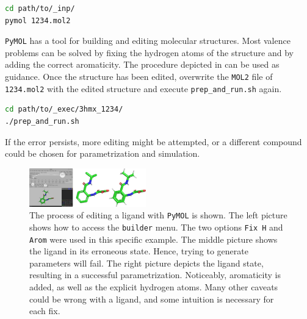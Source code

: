 \documentclass[9pt,tutorial]{livecoms}
\newcommand{\code}[1]{\colorbox{light-gray}{\texttt{#1}}}
\begin{document}
\begin{lstlisting}[language=bash]
cd path/to/_inp/
pymol 1234.mol2
\end{lstlisting}
\texttt{PyMOL} has a tool for building and editing molecular structures. Most valence problems can be solved by fixing the hydrogen atoms of the structure and by adding the correct aromaticity. The procedure depicted in  can be used as guidance. Once the structure has been edited, overwrite the \texttt{MOL2} file of \code{1234.mol2} with the edited structure and execute \code{prep\_and\_run.sh} again.
\begin{lstlisting}[language=bash]
cd path/to/_exec/3hmx_1234/
./prep_and_run.sh
\end{lstlisting}
If the error persists, more editing might be attempted, or a different compound could be chosen for parametrization and simulation.

\begin{figure}[H]
\centering
\includegraphics[width=0.45\textwidth]{figures/ligandfix_manual_guide.png}
\caption{The process of editing a ligand with \texttt{PyMOL} is shown. The left picture shows how to access the \texttt{builder} menu. The two options \texttt{Fix H} and \texttt{Arom} were used in this specific example. The middle picture shows the ligand in its erroneous state. Hence, trying to generate parameters will fail. The right picture depicts the ligand state, resulting in a successful parametrization. Noticeably, aromaticity is added, as well as the explicit hydrogen atoms. Many other caveats could be wrong with a ligand, and some intuition is necessary for each fix.}
\label{fig:ligandfix_manual_guide}
\end{figure}
\end{document}
